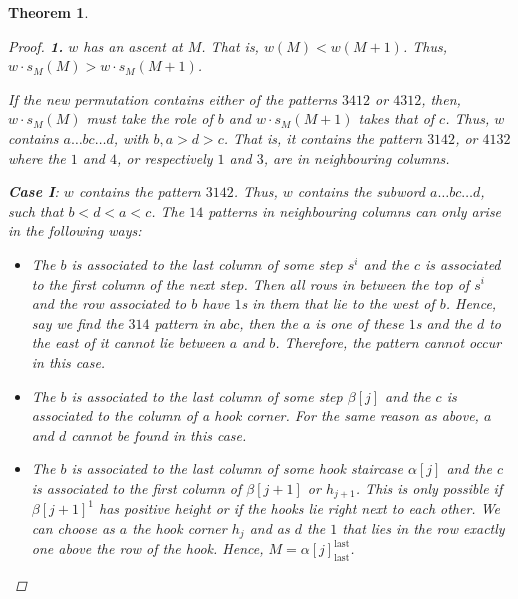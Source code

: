 \documentclass[11pt]{amsart}
\newtheorem{theorem}{Theorem}[section]
\theoremstyle{definition}
\theoremstyle{definition}
\theoremstyle{definition}
\theoremstyle{definition}
\begin{document}
\begin{theorem}
\begin{proof}
    \noindent \textbf{1.} $w$ has an ascent at $M$. That is, $w(M) < w(M+1)$. Thus, $w\cdot s_M(M) > w\cdot s_M(M+1)$. 
    
    If the new permutation contains either of the patterns $3412$ or $4312$, then, $w\cdot s_M(M)$ must take the role of $b$ and $w\cdot s_M(M+1)$ takes that of $c$. Thus, $w$ contains $a\ldots bc \ldots d$, with $b,a>d>c$. That is, it contains the pattern $3142$, or $4132$ where the $1$ and $4$, or respectively $1$ and $3$, are in neighbouring columns. 
    
    \noindent \textbf{Case I}: $w$ contains the pattern $3142$. Thus, $w$ contains the subword $a\ldots bc \ldots d$, such that $b<d<a<c$. The $14$ patterns in neighbouring columns can only arise in the following ways:

    \begin{itemize}
    \item The $b$ is associated to the last column of some step $s^i$ and the $c$ is associated to the first column of the next step. Then all rows in between the top of $s^i$ and the row associated to $b$ have $1$s in them that lie to the west of $b$. Hence, say we find the $314$ pattern in $abc$, then the $a$ is one of these $1$s
    and the $d$ to the east of it cannot lie between $a$ and $b$. Therefore, the pattern cannot occur in this case. 
    
    \item The $b$ is associated to the last column of some step $\beta[j]$ and the $c$ is associated to the column of a hook corner. 
    For the same reason as above, $a$ and $d$ cannot be found in this case.

    \item The $b$ is associated to the last column of some hook staircase $\alpha[j]$ and the $c$ is associated to the first column of $\beta[j+1]$ or $h_{j+1}$. This is only possible if $\beta[j+1]^1$ has positive height or if the hooks lie right next to each other. We can choose as $a$ the hook corner $h_j$ and as $d$ the $1$ that lies in the row exactly one above the row of the hook. Hence, $M= \alpha[j]_{\textrm{last}}^{\textrm{last}}$.
    

\end{itemize}
\end{proof}
\end{theorem}
\end{document}
